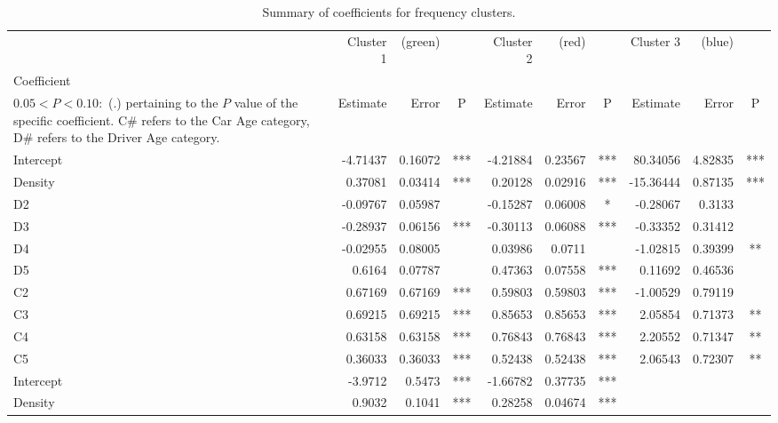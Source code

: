 \documentclass[12pt,letterpaper]{article}
\numberwithin{equation}{section}
\numberwithin{equation}{section}
\numberwithin{equation}{section}
\begin{document}
\begin{center}
\begin{table}
\caption{Summary of coefficients for frequency clusters.}
\label{frequencySummary}
\begin{tabular}{|l|rrc|rrc|rrc|}
\hline\hline
          & Cluster 1 & (green) &   & Cluster 2 & (red) &  & Cluster 3 & (blue) &   \\
Coefficient \footnote{The significance codes are defined as $  P < 0.001 : $  (***), $0.001 < P < 0.01:$ (**), $  0.01 < P < 0.05:$ (*),\\ $0.05 < P < 0.10 : $ (.) %
pertaining to the $P$ value of the specific coefficient. C\# refers to the Car Age category, D\# refers to the Driver Age category.  }         & Estimate  & Error & P   & Estimate  & Error   & P   & Estimate  & Error  & P  \\
 \hline
Intercept & -4.71437 & 0.16072 & *** & -4.21884 & 0.23567 & *** & 80.34056  & 4.82835 & *** \\
Density   & 0.37081  & 0.03414 & *** & 0.20128  & 0.02916 & *** & -15.36444 & 0.87135 & *** \\
D2        & -0.09767 & 0.05987 &     & -0.15287 & 0.06008 & *   & -0.28067  & 0.3133  &     \\
D3        & -0.28937 & 0.06156 & *** & -0.30113 & 0.06088 & *** & -0.33352  & 0.31412 &     \\
D4        & -0.02955 & 0.08005 &     & 0.03986  & 0.0711  &     & -1.02815  & 0.39399 & **  \\
D5        & 0.6164   & 0.07787 &     & 0.47363  & 0.07558 & *** & 0.11692   & 0.46536 &     \\
C2        & 0.67169  & 0.67169 & *** & 0.59803  & 0.59803 & *** & -1.00529  & 0.79119 &     \\
C3        & 0.69215  & 0.69215 & *** & 0.85653  & 0.85653 & *** & 2.05854   & 0.71373 & **  \\
C4        & 0.63158  & 0.63158 & *** & 0.76843  & 0.76843 & *** & 2.20552   & 0.71347 & **  \\
C5        & 0.36033  & 0.36033 & *** & 0.52438  & 0.52438 & *** & 2.06543   & 0.72307 & **  \\
\hline
Intercept & -3.9712  & 0.5473  & *** & -1.66782 & 0.37735 & *** &           &         &     \\
Density   & 0.9032   & 0.1041  & *** & 0.28258  & 0.04674 & *** &           &         &    \\
\hline\hline
\end{tabular}
\end{table}
\end{center}
\newpage
\end{document}
